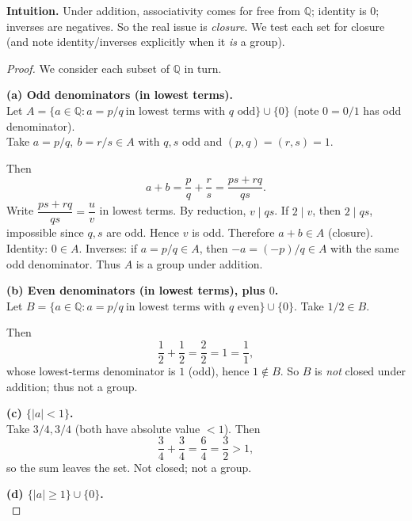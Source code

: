 \documentclass[12pt]{article}
\theoremstyle{definition}
\begin{document}
\dotfill

\noindent
\textbf{Intuition.}
Under addition, associativity comes for free from $\mathbb{Q}$; identity is $0$; inverses are negatives.
So the real issue is \emph{closure}. We test each set for closure (and note identity/inverses explicitly when it \emph{is} a group).

\dotfill

\begin{proof}
We consider each subset of $\mathbb{Q}$ in turn.

\dotfill

\noindent\textbf{(a) Odd denominators (in lowest terms).}\\

\noindent
Let $A=\{a\in\mathbb{Q}: a=p/q\ \text{in lowest terms with $q$ odd}\}\cup\{0\}$ 
(note $0=0/1$ has odd denominator). \\

\noindent
Take $a=p/q,\ b=r/s\in A$ with $q,s$ odd and $(p,q)=(r,s)=1$.

\noindent
Then
\[
a+b=\frac{p}{q}+\frac{r}{s}=\frac{ps+rq}{qs}.
\]
Write $\dfrac{ps+rq}{qs}=\dfrac{u}{v}$ in lowest terms. By reduction, $v\mid qs$.
If $2\mid v$, then $2\mid qs$, impossible since $q,s$ are odd. Hence $v$ is odd.
Therefore $a+b\in A$ (closure).
Identity: $0\in A$. Inverses: if $a=p/q\in A$, then $-a=(-p)/q\in A$ with the same odd denominator.
Thus $A$ is a group under addition.

\dotfill

\noindent\textbf{(b) Even denominators (in lowest terms), plus $0$.}\\

\noindent
Let $B=\{a\in\mathbb{Q}: a=p/q\ \text{in lowest terms with $q$ even}\}\cup\{0\}$.
Take $1/2\in B$. 

\noindent
Then
\[
\frac{1}{2}+\frac{1}{2}=\frac{2}{2}=1=\frac{1}{1},
\]
whose lowest-terms denominator is $1$ (odd), hence $1\notin B$.
So $B$ is \emph{not} closed under addition; thus not a group.

\dotfill

\noindent\textbf{(c) $\{|a|<1\}$.}\\

\noindent
Take $3/4,3/4$ (both have absolute value $<1$). Then
\[
\frac{3}{4}+\frac{3}{4}=\frac{6}{4}=\frac{3}{2}>1,
\]
so the sum leaves the set. Not closed; not a group.

\dotfill

\noindent\textbf{(d) $\{|a|\ge 1\}\cup\{0\}$.}\\


\end{proof}
\end{document}

